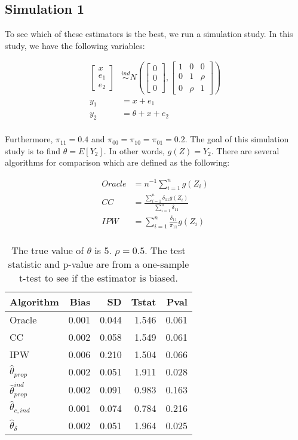 \documentclass[12pt]{article}
\begin{document}
\subsection*{Simulation 1}

To see which of these estimators is the best, we run a simulation study. In this 
study, we have the following variables:

\begin{align*}
  \begin{bmatrix} x \\ e_1 \\ e_2 \end{bmatrix} 
  &\stackrel{ind}{\sim} N\left(\begin{bmatrix} 0 \\ 0 \\ 0 \end{bmatrix}, 
  \begin{bmatrix} 1 & 0 & 0 \\ 0 & 1 & \rho \\ 0 & \rho & 1 \end{bmatrix}\right) \\
  y_1 &= x + e_1 \\
  y_2 &= \theta + x + e_2 \\
\end{align*}

Furthermore, $\pi_{11} = 0.4$ and $\pi_{00} = \pi_{10} = \pi_{01} = 0.2$.
The goal of this simulation study is to find $\theta = E[Y_2]$. In other words,
$g(Z) = Y_2$. There are several algorithms for comparison which are defined 
as the following:

\begin{align*}
  Oracle &= n^{-1} \sum_{i = 1}^n g(Z_i)\\
  CC &= \frac{\sum_{i = 1}^n \delta_{11} g(Z_i)}{\sum_{i = 1}^n \delta_{11}} \\
  IPW &= \sum_{i = 1}^n \frac{\delta_{11}}{\pi_{11}} g(Z_i)\\
\end{align*}


\begin{table}[ht!]
\caption{The true value of $\theta$ is 5. $\rho = 0.5$. The test statistic and 
p-value are from a one-sample t-test to see if the estimator is biased.}
\centering
\begin{tabular}[t]{lrrrr}
\toprule
Algorithm & Bias & SD & Tstat & Pval\\
\midrule
Oracle & 0.001 & 0.044 & 1.546 & 0.061\\
CC & 0.002 & 0.058 & 1.549 & 0.061\\
IPW & 0.006 & 0.210 & 1.504 & 0.066\\
$\hat \theta_{prop}$ & 0.002 & 0.051 & 1.911 & 0.028\\
$\hat \theta_{prop}^{ind}$ & 0.002 & 0.091 & 0.983 & 0.163\\
$\hat \theta_{c, ind}$ & 0.001 & 0.074 & 0.784 & 0.216\\
$\hat \theta_{\delta}$ & 0.002 & 0.051 & 1.964 & 0.025\\
\bottomrule
\end{tabular}
\end{table}
\end{document}
